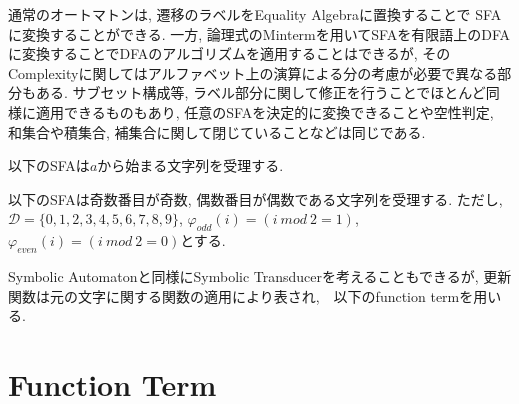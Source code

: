 \documentclass[uplatex,dvipdfmx,a4j]{jsreport}
\begin{document}
  通常のオートマトンは, 遷移のラベルをEquality Algebraに置換することで
  SFAに変換することができる.
  一方, 論理式のMintermを用いてSFAを有限語上のDFAに変換することでDFAのアルゴリズムを適用することはできるが,
  そのComplexityに関してはアルファベット上の演算による分の考慮が必要で異なる部分もある.
  サブセット構成等, ラベル部分に関して修正を行うことでほとんど同様に適用できるものもあり,
  任意のSFAを決定的に変換できることや空性判定, 和集合や積集合, 補集合に関して閉じていることなどは同じである.

  \begin{example}
    以下のSFAは$a$から始まる文字列を受理する.
    \begin{center}
    \end{center}
  \end{example}

  \begin{example}
    以下のSFAは奇数番目が奇数, 偶数番目が偶数である文字列を受理する.
    ただし, $\mathcal{D} = \{ 0, 1, 2, 3, 4, 5, 6, 7, 8, 9 \}$,
    $\varphi_{odd}(i) = (i\ mod\ 2 = 1)$, $\varphi_{even}(i) = (i\ mod\ 2 = 0)$とする.
    \begin{center}
    \end{center}
  \end{example}

  Symbolic Automatonと同様にSymbolic Transducerを考えることもできるが,
  更新関数は元の文字に関する関数の適用により表され,　以下のfunction termを用いる.

  \section{Function Term}
\end{document}
